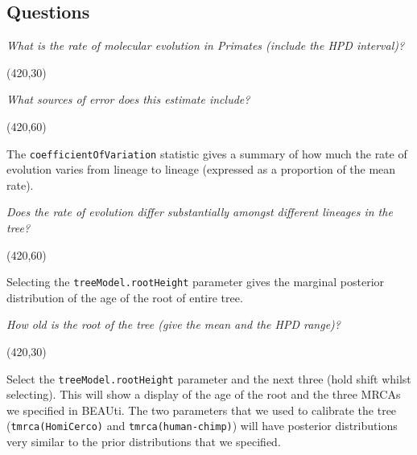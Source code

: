 \documentclass[12pt]{article}
\begin{document}
\newpage
\subsection*{Questions}
 \vspace{5 mm}

\textit{What is the rate of molecular evolution in Primates (include the HPD interval)?}

 \vspace{5 mm}
 \framebox(420,30){}
  \vspace{5 mm}


\textit{What sources of error does this estimate include?}
 
 \vspace{5 mm}
 \framebox(420,60){}
   \vspace{5 mm}
   
   The \texttt{coefficientOfVariation} statistic gives a summary of how much the rate of evolution varies from lineage to lineage (expressed as a proportion of the mean rate).
   
   \bigskip{}

\textit{Does the rate of evolution differ substantially amongst different lineages in the tree?}

 \vspace{5 mm}
 \framebox(420,60){}
   \vspace{5 mm}

Selecting the \texttt{treeModel.rootHeight} parameter gives the marginal posterior distribution of the age of the root of entire tree.

   \bigskip{}

\textit{How old is the root of the tree (give the mean and the HPD range)?}

 \vspace{5 mm}
 \framebox(420,30){}
   \vspace{5 mm}

Select the \texttt{treeModel.rootHeight} parameter and the next three (hold shift whilst selecting). This will show a display of the
age of the root and the three MRCAs we specified in BEAUti. The two parameters that we used to calibrate the tree
(\texttt{tmrca(HomiCerco)} and \texttt{tmrca(human-chimp)}) will have posterior distributions very similar to the prior distributions
that we specified. 

\medskip{}
\end{document}
